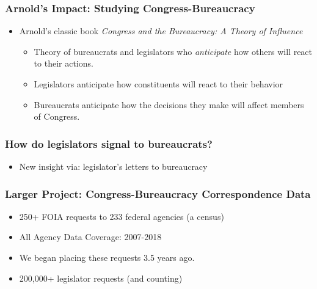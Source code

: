 \documentclass[13pt]{beamer}
\begin{document}
\begin{frame} 
\frametitle{Arnold's Impact: Studying Congress-Bureaucracy}
\Large

\begin{itemize}
\item Arnold's classic book \emph{Congress and the Bureaucracy: A Theory of Influence}
\begin{itemize}
\item[-]  Theory of bureaucrats and legislators who \emph{anticipate} how others will react to their actions. 
\item[-] Legislators anticipate how constituents will react to their behavior
\item[-] Bureaucrats anticipate how the decisions they make will affect members of Congress. 
\end{itemize}
\end{itemize}
\end{frame}
\begin{frame}
\frametitle{How do legislators signal to bureaucrats?}
\Large
\begin{itemize}
\item[] New insight via: legislator's letters to bureaucracy
\end{itemize}
\end{frame}
\begin{frame}
\frametitle{Larger Project: Congress-Bureaucracy Correspondence Data}
\Large
\begin{itemize}
\item 250+ FOIA requests to 233 federal agencies (a census)
\item All Agency Data Coverage: 2007-2018
\item We began placing these requests 3.5 years ago.
\item 200,000+ legislator requests (and counting)
\end{itemize}
 

\end{frame}
\end{document}

